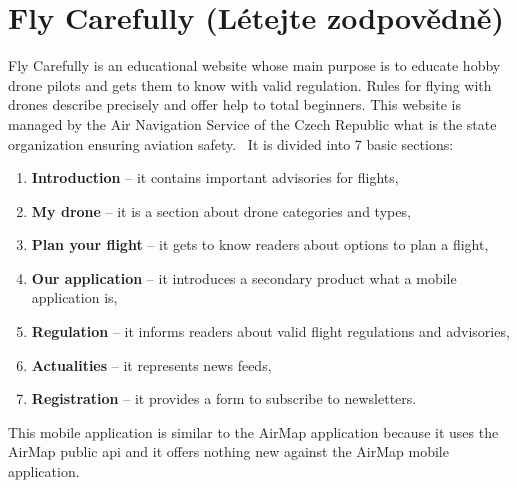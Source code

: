 \section{Fly Carefully (L{\' e}tejte zodpov{\v e}dn{\v e})}\label{sec:fly-carefully}
Fly Carefully is an educational website whose main purpose is to educate hobby drone pilots and gets them to know with valid regulation.
Rules for flying with drones describe precisely and offer help to total beginners.
This website is managed by the Air Navigation Service of the Czech Republic what is the state organization ensuring aviation safety.~\cite{flyCarefully}
It is divided into 7 basic sections:
\begin{enumerate}
    \item \textbf{Introduction} -- it contains important advisories for flights,
    \item \textbf{My drone} -- it is a section about drone categories and types,
    \item \textbf{Plan your flight} -- it gets to know readers about options to plan a flight,
    \item \textbf{Our application} -- it introduces a secondary product what a mobile application is,
    \item \textbf{Regulation} -- it informs readers about valid flight regulations and advisories,
    \item \textbf{Actualities} -- it represents news feeds,
    \item \textbf{Registration} -- it provides a form to subscribe to newsletters.
\end{enumerate}
This mobile application is similar to the AirMap application because it uses the AirMap public \acrshort{api} and it offers nothing new against the AirMap mobile application.

